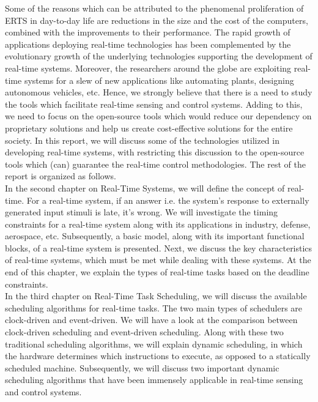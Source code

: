 \documentclass[12pt]{report}
\begin{document}
Some of the reasons which can be attributed to the phenomenal proliferation of ERTS in day-to-day life are reductions in the size and the cost of the computers, combined with the improvements to their performance. The rapid growth of applications deploying real-time technologies has been complemented by the evolutionary growth of the underlying technologies supporting the development of real-time systems. Moreover, the researchers around the globe are exploiting real-time systems for a slew of new applications like automating plants, designing autonomous vehicles, etc. Hence, we strongly believe that there is a need to study the tools which facilitate real-time sensing and control systems. Adding to this, we need to focus on the open-source tools which would reduce our dependency on proprietary solutions and help us create cost-effective solutions for the entire society. In this report, we will discuss some of the technologies utilized in developing real-time systems, with restricting this discussion to the open-source tools which (can) guarantee the real-time control methodologies. The rest of the report is organized as follows. \\ 

In the second chapter on Real-Time Systems, we will define the concept of real-time. For a real-time system, if an answer i.e. the system's response to externally generated input stimuli is late, it's wrong. We will investigate the timing constraints for a real-time system along with its applications in industry, defense, aerospace, etc. Subsequently, a basic model, along with its important functional blocks, of a real-time system is presented. Next, we discuss the key characteristics of real-time systems, which must be met while dealing with these systems. At the end of this chapter, we explain the types of real-time tasks based on the deadline constraints.  \\ 

In the third chapter on Real-Time Task Scheduling, we will discuss the available scheduling algorithms for real-time tasks. The two main types of schedulers are clock-driven and event-driven. We will have a look at the comparison between clock-driven scheduling and event-driven scheduling. Along with these two traditional scheduling algorithms, we will explain dynamic scheduling, in which the hardware determines which instructions to execute, as opposed to a statically scheduled machine. Subsequently, we will discuss two important dynamic scheduling algorithms that have been immensely applicable in real-time sensing and control systems. \\ 
\end{document}
